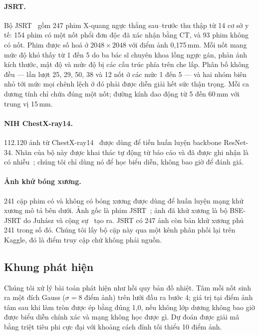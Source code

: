 \documentclass[12pt,a4paper]{article}
\begin{document}
\paragraph{JSRT.}
Bộ JSRT~\cite{shiraishi2000jsrt} gồm 247 phim X-quang ngực thẳng sau--trước thu
thập từ 14 cơ sở y tế: 154 phim có một nốt phổi đơn độc đã xác nhận bằng CT, và
93 phim không có nốt. Phim được số hoá ở $2048 \times 2048$ với điểm ảnh
0,175\,mm. Mỗi nốt mang mức độ khó thấy từ 1 đến 5 do ba bác sĩ chuyên khoa lồng
ngực gán, phản ánh kích thước, mật độ và mức độ bị các cấu trúc phía trên che
lấp. Phân bố không đều --- lần lượt 25, 29, 50, 38 và 12 nốt ở các mức 1 đến 5
--- và hai nhóm biên nhỏ tới mức mọi chênh lệch ở đó phải được diễn giải hết sức
thận trọng. Mỗi ca dương tính chỉ chứa đúng một nốt; đường kính dao động từ 5
đến 60\,mm với trung vị 15\,mm.

\paragraph{NIH ChestX-ray14.}
112.120 ảnh từ ChestX-ray14~\cite{wang2017chestxray} được dùng để tiền huấn
luyện backbone ResNet-34. Nhãn của bộ này được khai thác tự động từ báo cáo và
đã được ghi nhận là có nhiễu~\cite{oakdenrayner2020exploring}; chúng tôi chỉ dùng
nó để học biểu diễn, không bao giờ để đánh giá.

\paragraph{Ảnh khử bóng xương.}
241 cặp phim có và không có bóng xương được dùng để huấn luyện mạng khử xương mô
tả bên dưới. Ảnh gốc là phim JSRT~\cite{shiraishi2000jsrt}; ảnh đã khử xương là
bộ BSE-JSRT do Juhász và cộng sự~\cite{juhasz2010bse} tạo ra. JSRT có 247 ảnh còn
bản khử xương phủ 241 trong số đó. Chúng tôi lấy bộ cặp này qua một kênh phân
phối lại trên Kaggle, đó là điểm truy cập chứ không phải nguồn.

\subsection{Khung phát hiện}

Chúng tôi xử lý bài toán phát hiện như hồi quy bản đồ nhiệt. Tâm mỗi nốt sinh ra
một đích Gauss ($\sigma = 8$ điểm ảnh) trên lưới đầu ra bước 4; giá trị tại điểm
ảnh tâm sau khi làm tròn được ép bằng đúng 1,0, nếu không lớp dương không bao giờ
được biểu diễn chính xác và mạng không học được gì. Dự đoán được giải mã bằng
triệt tiêu phi cực đại với khoảng cách đỉnh tối thiểu 10 điểm ảnh.
\end{document}
